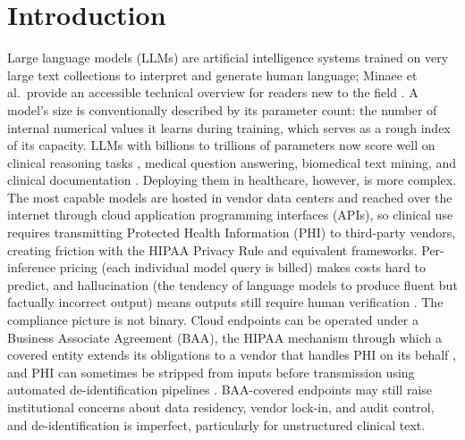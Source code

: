 \documentclass[11pt]{article}
\begin{document}
\section{Introduction}

Large language models (LLMs) are artificial intelligence systems trained on very large text collections to interpret and generate human language; Minaee et al.\ provide an accessible technical overview for readers new to the field \cite{Minaee2024}. A model's size is conventionally described by its parameter count: the number of internal numerical values it learns during training, which serves as a rough index of its capacity. LLMs with billions to trillions of parameters now score well on clinical reasoning tasks \cite{Singhal2023, Nori2023}, medical question answering, biomedical text mining, and clinical documentation \cite{Thirunavukarasu2023, VanVeen2024}. Deploying them in healthcare, however, is more complex. The most capable models are hosted in vendor data centers and reached over the internet through cloud application programming interfaces (APIs), so clinical use requires transmitting Protected Health Information (PHI) to third-party vendors, creating friction with the HIPAA Privacy Rule and equivalent frameworks. Per-inference pricing (each individual model query is billed) makes costs hard to predict, and hallucination (the tendency of language models to produce fluent but factually incorrect output) means outputs still require human verification \cite{Adams2026, Su2025}. The compliance picture is not binary. Cloud endpoints can be operated under a Business Associate Agreement (BAA), the HIPAA mechanism through which a covered entity extends its obligations to a vendor that handles PHI on its behalf \cite{HHSBAA, Marks2023HIPAAAI}, and PHI can sometimes be stripped from inputs before transmission using automated de-identification pipelines \cite{Kovacevic2024DeID}. BAA-covered endpoints may still raise institutional concerns about data residency, vendor lock-in, and audit control, and de-identification is imperfect, particularly for unstructured clinical text.
\end{document}
